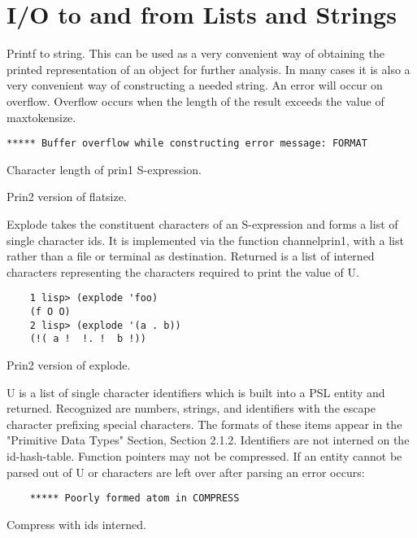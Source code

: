 

\section{I/O to and from Lists and Strings}

{    Printf to string.  This can be used as a very convenient way
    of  obtaining  the  printed  representation of an object for
    further  analysis.   In  many  cases  it  is  also  a   very
    convenient  way  of  constructing a needed string.  An error
    will occur on overflow.  Overflow occurs when the length  of
    the result exceeds the value of maxtokensize.
}
\begin{verbatim}
***** Buffer overflow while constructing error message: FORMAT
\end{verbatim}
{    Character length of prin1 S-expression.  }

{    Prin2 version of flatsize.  }

{    Explode takes the constituent characters of an  S-expression
    and forms a list of single character ids.  It is implemented
    via  the  function  channelprin1,  with a list rather than a
    file or terminal as destination.   Returned  is  a  list  of
    interned  characters representing the characters required to
    print the value of U.
}
\begin{verbatim}
    1 lisp> (explode 'foo)
    (f O O)
    2 lisp> (explode '(a . b))
    (!( a !  !. !  b !))
\end{verbatim}

{    Prin2 version of explode.  }

{    U is a list of single character identifiers which  is  built
    into  a PSL  entity and returned.   Recognized are  numbers,
    strings,  and  identifiers  with    the   escape   character
    prefixing    special characters.  The formats of these items
    appear in the "Primitive Data Types" Section, Section 2.1.2.
    Identifiers are not interned on the id-hash-table.  Function
    pointers may not be compressed.   If  an  entity  cannot  be
    parsed out of U or characters are left over after parsing an
    error occurs: }
\begin{verbatim}
    ***** Poorly formed atom in COMPRESS
\end{verbatim}
{    Compress with ids interned.
}

